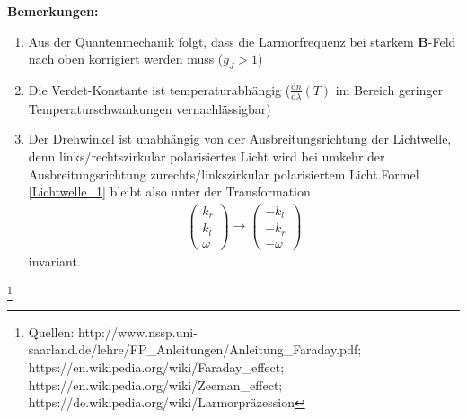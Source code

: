 \documentclass[12pt,a4paper]{article}
\begin{document}
\textbf{Bemerkungen:}
\begin{enumerate}
\item
Aus der Quantenmechanik folgt, dass die Larmorfrequenz bei starkem \textbf{B}-Feld nach oben korrigiert werden muss ($g_J > 1$)
\item
Die Verdet-Konstante ist temperaturabhängig ($\frac{\text{d} n}{\text{d} \lambda}(T)$ im Bereich geringer Temperaturschwankungen vernachlässigbar)
\item
Der Drehwinkel ist unabhängig von der Ausbreitungsrichtung der Lichtwelle, denn \newline links/rechtszirkular polarisiertes Licht wird bei umkehr der Ausbreitungsrichtung zu\newline rechts/linkszirkular polarisiertem Licht.\newline Formel \ref{Lichtwelle_1} bleibt also unter der Transformation 
\begin{align}
\begin{pmatrix}
k_r \\
k_l \\
\omega
\end{pmatrix} \rightarrow 
\begin{pmatrix}
-k_l\\
-k_r\\
-\omega
\end{pmatrix}
\end{align} invariant. 
\end{enumerate} 

\footnote{Quellen: \newline http://www.nssp.uni-saarland.de/lehre/FP\_Anleitungen/Anleitung\_Faraday.pdf; \newline https://en.wikipedia.org/wiki/Faraday\_effect; https://en.wikipedia.org/wiki/Zeeman\_effect; \newline https://de.wikipedia.org/wiki/Larmorpräzession}
\end{document}
